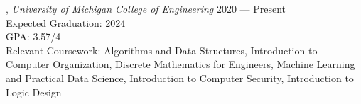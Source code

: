 
, \textit{University of Michigan College of Engineering}	\hfill 2020 --- Present \\
\text Expected Graduation: 2024 \\
 \text GPA: 3.57/4 \\
 \text Relevant Coursework: Algorithms and Data Structures, Introduction to Computer Organization, Discrete Mathematics for Engineers, Machine Learning and Practical Data Science, Introduction to Computer Security, Introduction to Logic Design

